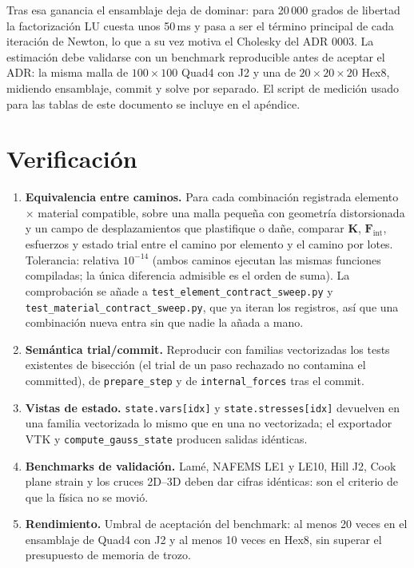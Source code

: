 \documentclass[11pt,letterpaper,oneside]{article}
\newcommand{\code}[1]{\texttt{#1}}
\begin{document}
Tras esa ganancia el ensamblaje deja de dominar: para 20\,000 grados de libertad la factorización LU cuesta unos 50\,ms y pasa a ser el término principal de cada iteración de Newton, lo que a su vez motiva el Cholesky del ADR 0003. La estimación debe validarse con un benchmark reproducible antes de aceptar el ADR: la misma malla de $100\times100$ Quad4 con J2 y una de $20\times20\times20$ Hex8, midiendo ensamblaje, commit y solve por separado. El script de medición usado para las tablas de este documento se incluye en el apéndice.

\section{Verificación}

\begin{enumerate}[nosep]
  \item \textbf{Equivalencia entre caminos.} Para cada combinación registrada elemento $\times$ material compatible, sobre una malla pequeña con geometría distorsionada y un campo de desplazamientos que plastifique o dañe, comparar $\mathbf K$, $\mathbf F_{\text{int}}$, esfuerzos y estado trial entre el camino por elemento y el camino por lotes. Tolerancia: relativa $10^{-14}$ (ambos caminos ejecutan las mismas funciones compiladas; la única diferencia admisible es el orden de suma). La comprobación se añade a \code{test\_element\_contract\_sweep.py} y \code{test\_material\_contract\_sweep.py}, que ya iteran los registros, así que una combinación nueva entra sin que nadie la añada a mano.
  \item \textbf{Semántica trial/commit.} Reproducir con familias vectorizadas los tests existentes de bisección (el trial de un paso rechazado no contamina el committed), de \code{prepare\_step} y de \code{internal\_forces} tras el commit.
  \item \textbf{Vistas de estado.} \code{state.vars[idx]} y \code{state.stresses[idx]} devuelven en una familia vectorizada lo mismo que en una no vectorizada; el exportador VTK y \code{compute\_gauss\_state} producen salidas idénticas.
  \item \textbf{Benchmarks de validación.} Lamé, NAFEMS LE1 y LE10, Hill J2, Cook plane strain y los cruces 2D--3D deben dar cifras idénticas: son el criterio de que la física no se movió.
  \item \textbf{Rendimiento.} Umbral de aceptación del benchmark: al menos 20 veces en el ensamblaje de Quad4 con J2 y al menos 10 veces en Hex8, sin superar el presupuesto de memoria de trozo.
\end{enumerate}
\end{document}
